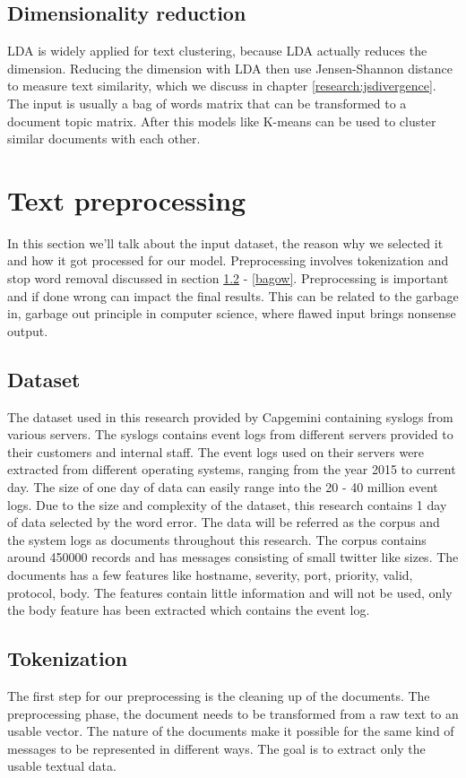 \subsection{Dimensionality reduction}
LDA is widely applied for text clustering, because LDA actually reduces the dimension. Reducing the dimension with LDA then use Jensen-Shannon distance  to measure text similarity, which we discuss in chapter \ref{research:jsdivergence}. The input is usually a bag of words matrix that can be transformed to a document topic matrix. After this models like K-means can be used to cluster similar documents with each other. 

\section{Text preprocessing}
In this section we'll talk about the input dataset, the reason why we selected it and how it got processed for our model. Preprocessing involves tokenization and stop word removal discussed in section \ref{tokenization} - \ref{bagow}. Preprocessing is important and if done wrong can impact the final results. This can be related to the garbage in, garbage out principle in computer science, where flawed input brings nonsense output. 

\subsection{Dataset}
The dataset used in this research provided by Capgemini containing syslogs from various servers. The syslogs contains event logs from different servers provided to their customers and internal staff. The event logs used on their servers were extracted from different operating systems, ranging from the year 2015 to current day. The size of one day of data can easily range into the 20 - 40 million event logs. Due to the size and complexity of the dataset, this research contains 1 day of data selected by the word error.
The data will be referred as the corpus and the system logs as documents throughout this research. The corpus contains around 450000 records and has messages consisting of small twitter like sizes. The documents has a few features like hostname, severity, port, priority, valid, protocol, body. The features contain little information and will not be used, only the body feature has been extracted which contains the event log.

\subsection{Tokenization}\label{tokenization}
The first step for our preprocessing is the cleaning up of the documents. 
The preprocessing phase, the document needs to be transformed from a raw text to an usable vector. The nature of the documents make it possible for the same kind of messages to be represented in different ways. The goal is to extract only the usable textual data.

